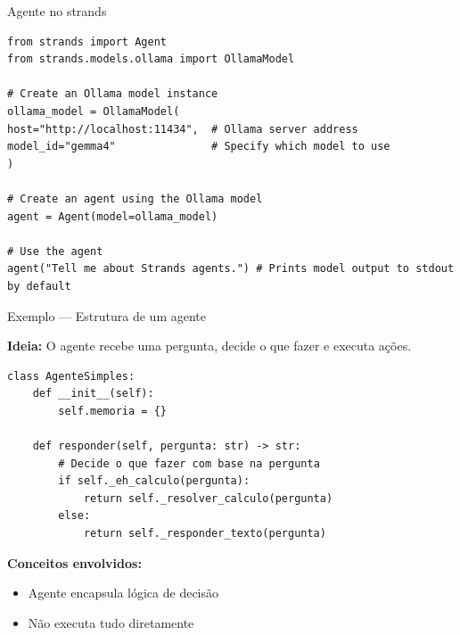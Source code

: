 \documentclass{beamer}
\begin{document}
\begin{frame}{Agente no strands}
	\begin{verbatim}
from strands import Agent
from strands.models.ollama import OllamaModel

# Create an Ollama model instance
ollama_model = OllamaModel(
host="http://localhost:11434",  # Ollama server address
model_id="gemma4"               # Specify which model to use
)

# Create an agent using the Ollama model
agent = Agent(model=ollama_model)

# Use the agent
agent("Tell me about Strands agents.") # Prints model output to stdout by default
	\end{verbatim}
\end{frame}

\begin{frame}[fragile]{Exemplo — Estrutura de um agente}
    
    \textbf{Ideia:}  
    O agente recebe uma pergunta, decide o que fazer e executa ações.
    
    \begin{verbatim}
class AgenteSimples:
    def __init__(self):
        self.memoria = {}

    def responder(self, pergunta: str) -> str:
        # Decide o que fazer com base na pergunta
        if self._eh_calculo(pergunta):
            return self._resolver_calculo(pergunta)
        else:
            return self._responder_texto(pergunta)
    \end{verbatim}
    
    \vspace{0.3cm}
    
    \textbf{Conceitos envolvidos:}
    \begin{itemize}
        \item Agente encapsula lógica de decisão
        \item Não executa tudo diretamente
    \end{itemize}
    
\end{frame}
\end{document}
